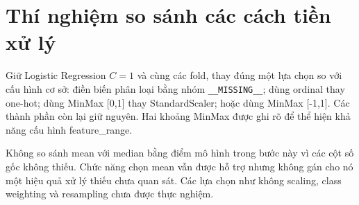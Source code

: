 \section{Thí nghiệm so sánh các cách tiền xử lý}
\label{sec:5_5}
Giữ Logistic Regression $C=1$ và cùng các fold, thay đúng một lựa chọn so với cấu hình cơ sở: điền biến phân loại bằng nhóm \texttt{\_\_MISSING\_\_}; dùng ordinal thay one-hot; dùng MinMax [0,1] thay StandardScaler; hoặc dùng MinMax [-1,1]. Các thành phần còn lại giữ nguyên. Hai khoảng MinMax được ghi rõ để thể hiện khả năng cấu hình feature\_range.

Không so sánh mean với median bằng điểm mô hình trong bước này vì các cột số gốc không thiếu. Chức năng chọn mean vẫn được hỗ trợ nhưng không gán cho nó một hiệu quả xử lý thiếu chưa quan sát. Các lựa chọn như không scaling, class weighting và resampling chưa được thực nghiệm.

